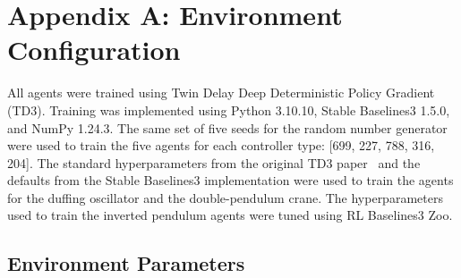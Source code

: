 
\chapter*{Appendix A: Environment Configuration}

All agents were trained using Twin Delay Deep Deterministic Policy Gradient (TD3). Training was implemented using Python 3.10.10, Stable Baselines3 1.5.0, and NumPy 1.24.3.
The same set of five seeds for the random number generator were used to train the five agents for each controller type: [699, 227, 788, 316, 204].
The standard hyperparameters from the original TD3 paper~\cite{Fujimoto:2018a} and the defaults from the Stable Baselines3 implementation were used to train the agents for the duffing oscillator and the double-pendulum crane. The hyperparameters used to train the inverted pendulum agents were tuned using RL Baselines3 Zoo.

\section*{Environment Parameters}

